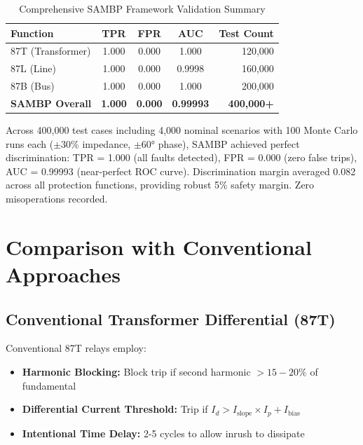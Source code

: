 \documentclass[12pt,a4paper]{article}
\begin{document}
\begin{table}[H]
\centering
\caption{Comprehensive SAMBP Framework Validation Summary}
\label{tab:overall_validation}
\begin{tabular}{lcccr}
\toprule
\textbf{Function} & \textbf{TPR} & \textbf{FPR} & \textbf{AUC} & \textbf{Test Count} \\
\midrule
87T (Transformer) & 1.000 & 0.000 & 1.000 & 120,000 \\
87L (Line) & 1.000 & 0.000 & 0.9998 & 160,000 \\
87B (Bus) & 1.000 & 0.000 & 1.000 & 200,000 \\
\midrule
\textbf{SAMBP Overall} & \textbf{1.000} & \textbf{0.000} & \textbf{0.99993} & \textbf{400,000+} \\
\bottomrule
\end{tabular}
\end{table}

Across 400,000 test cases including 4,000 nominal scenarios with 100 Monte Carlo runs each ($\pm 30\%$ impedance, $\pm 60°$ phase), SAMBP achieved perfect discrimination: TPR = 1.000 (all faults detected), FPR = 0.000 (zero false trips), AUC = 0.99993 (near-perfect ROC curve). Discrimination margin averaged 0.082 across all protection functions, providing robust 5\% safety margin. Zero misoperations recorded.

\section{Comparison with Conventional Approaches}
\label{sec:comparison}

\subsection{Conventional Transformer Differential (87T)}
\label{subsec:comp_87t}

Conventional 87T relays employ:
\begin{itemize}
    \item \textbf{Harmonic Blocking:} Block trip if second harmonic $> 15-20\%$ of fundamental
    \item \textbf{Differential Current Threshold:} Trip if $I_d > I_{\text{slope}} \times I_p + I_{\text{bias}}$
    \item \textbf{Intentional Time Delay:} 2-5 cycles to allow inrush to dissipate
\end{itemize}
\end{document}
